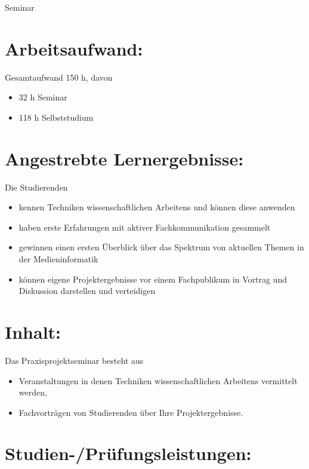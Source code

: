 Seminar

\section*{Arbeitsaufwand:}\label{arbeitsaufwand-18}

Gesamtaufwand 150 h, davon

\begin{itemize}
\tightlist
\item
  32 h Seminar
\item
  118 h Selbststudium
\end{itemize}

\section*{Angestrebte
Lernergebnisse:}\label{angestrebte-lernergebnisse-19}

Die Studierenden

\begin{itemize}
\tightlist
\item
  kennen Techniken wissenschaftlichen Arbeitens und können diese
  anwenden
\item
  haben erste Erfahrungen mit aktiver Fachkommunikation gesammelt
\item
  gewinnen einen ersten Überblick über das Spektrum von aktuellen Themen
  in der Medieninformatik
\item
  können eigene Projektergebnisse vor einem Fachpublikum in Vortrag und
  Diskussion darstellen und verteidigen
\end{itemize}

\section*{Inhalt:}\label{inhalt-19}

Das Praxisprojektseminar besteht aus

\begin{itemize}
\tightlist
\item
  Veranstaltungen in denen Techniken wissenschaftlichen Arbeitens
  vermittelt werden,
\item
  Fachvorträgen von Studierenden über Ihre Projektergebnisse.
\end{itemize}

\section*{Studien-/Prüfungsleistungen:}\label{studien-pruxfcfungsleistungen-17}

